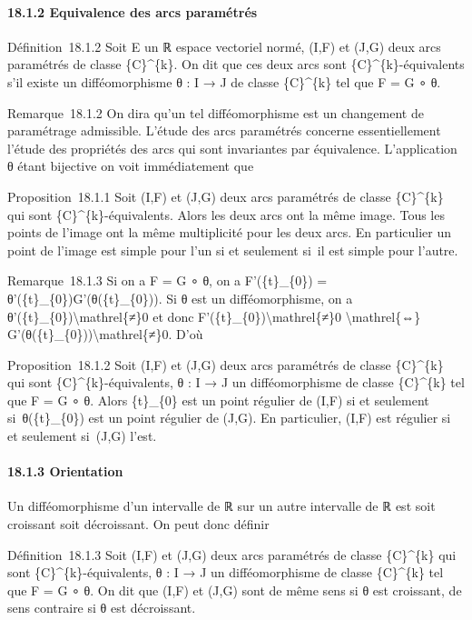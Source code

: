 \documentclass[]{article}
\begin{document}
\paragraph{18.1.2 Equivalence des arcs paramétrés}

Définition~18.1.2 Soit E un ℝ espace vectoriel normé, (I,F) et (J,G)
deux arcs paramétrés de classe \{C\}\^{}\{k\}. On dit que ces deux arcs
sont \{C\}\^{}\{k\}-équivalents s'il existe un difféomorphisme θ : I → J
de classe \{C\}\^{}\{k\} tel que F = G ∘ θ.

Remarque~18.1.2 On dira qu'un tel difféomorphisme est un changement de
paramétrage admissible. L'étude des arcs paramétrés concerne
essentiellement l'étude des propriétés des arcs qui sont invariantes par
équivalence. L'application θ étant bijective on voit immédiatement que

Proposition~18.1.1 Soit (I,F) et (J,G) deux arcs paramétrés de classe
\{C\}\^{}\{k\} qui sont \{C\}\^{}\{k\}-équivalents. Alors les deux arcs
ont la même image. Tous les points de l'image ont la même multiplicité
pour les deux arcs. En particulier un point de l'image est simple pour
l'un si et seulement si~il est simple pour l'autre.

Remarque~18.1.3 Si on a F = G ∘ θ, on a F'(\{t\}\_\{0\}) =
θ'(\{t\}\_\{0\})G'(θ(\{t\}\_\{0\})). Si θ est un difféomorphisme, on a
θ'(\{t\}\_\{0\})\textbackslash{}mathrel\{≠\}0 et donc
F'(\{t\}\_\{0\})\textbackslash{}mathrel\{≠\}0
\textbackslash{}mathrel\{⇔\}
G'(θ(\{t\}\_\{0\}))\textbackslash{}mathrel\{≠\}0. D'où

Proposition~18.1.2 Soit (I,F) et (J,G) deux arcs paramétrés de classe
\{C\}\^{}\{k\} qui sont \{C\}\^{}\{k\}-équivalents, θ : I → J un
difféomorphisme de classe \{C\}\^{}\{k\} tel que F = G ∘ θ. Alors
\{t\}\_\{0\} est un point régulier de (I,F) si et seulement
si~θ(\{t\}\_\{0\}) est un point régulier de (J,G). En particulier, (I,F)
est régulier si et seulement si~(J,G) l'est.

\paragraph{18.1.3 Orientation}

Un difféomorphisme d'un intervalle de ℝ sur un autre intervalle de ℝ est
soit croissant soit décroissant. On peut donc définir

Définition~18.1.3 Soit (I,F) et (J,G) deux arcs paramétrés de classe
\{C\}\^{}\{k\} qui sont \{C\}\^{}\{k\}-équivalents, θ : I → J un
difféomorphisme de classe \{C\}\^{}\{k\} tel que F = G ∘ θ. On dit que
(I,F) et (J,G) sont de même sens si θ est croissant, de sens contraire
si θ est décroissant.
\end{document}
